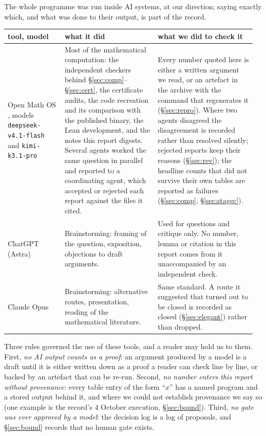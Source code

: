 \documentclass[10pt]{article}
\theoremstyle{definition}
\begin{document}
The whole programme was run inside AI systems, at our direction; saying exactly which, and what was
done to their output, is part of the record.

\begin{center}
\small
\begin{tabular}{@{}L{0.22\linewidth}L{0.36\linewidth}L{0.38\linewidth}@{}}
\toprule
tool, model & what it did & what we did to check it \\
\midrule
Open Math OS \cite{omos}, models \texttt{deepseek-v4.1-flash} and
\texttt{kimi-k3.1-pro} &
Most of the mathematical computation: the independent checkers behind \S\ref{sec:comp}--\S\ref{sec:cert}, the certificate audits,
the code recreation and its comparison with the published binary, the Lean development, and the notes
this report digests. Several agents worked the same question in parallel and reported to a
coordinating agent, which accepted or rejected each report against the files it cited. &
Every number quoted here is either a written argument we read, or an artefact in the archive with the
command that regenerates it (\S\ref{sec:repro}). Where two agents disagreed the disagreement is recorded rather
than resolved silently; rejected reports keep their reasons (\S\ref{sec:rev}); the headline
counts that did not survive their own tables are reported as failures (\S\ref{sec:comp}, \S\ref{sec:stagec}). \\
ChatGPT (Astra) \cite{astra} & Brainstorming: framing of the question, exposition, objections to draft
arguments. & Used for questions and critique only. No number, lemma or citation in this report comes
from it unaccompanied by an independent check. \\
Claude Opus \cite{opus} & Brainstorming: alternative routes, presentation, reading of the mathematical
literature. & Same standard. A route it suggested that turned out to be closed is recorded as closed
(\S\ref{sec:elegant}) rather than dropped. \\
\bottomrule
\end{tabular}
\end{center}

Three rules governed the use of these tools, and a reader may hold us to them. First, \emph{no AI
output counts as a proof}: an argument produced by a model is a draft until it is either written down
as a proof a reader can check line by line, or backed by an artefact that can be re-run. Second,
\emph{no number enters this report without provenance}: every table entry of the form ``$x$'' has a
named program and a stored output behind it, and where we could not establish provenance we say so
(one example is the record's $4$ October execution, \S\ref{sec:bound}). Third, \emph{no gate was ever approved by a
model}: the decision log is a log of proposals, and \S\ref{sec:bound} records that no human gate exists.
\end{document}
